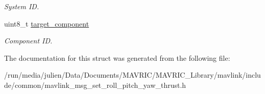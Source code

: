 \begin{DoxyCompactItemize}
\begin{DoxyCompactList}\small\item\em System I\+D. \end{DoxyCompactList}\item 
\hypertarget{struct____mavlink__set__roll__pitch__yaw__thrust__t_a59af37fe8843779a2aca045357ac9c96}{uint8\+\_\+t \hyperlink{struct____mavlink__set__roll__pitch__yaw__thrust__t_a59af37fe8843779a2aca045357ac9c96}{target\+\_\+component}}\label{struct____mavlink__set__roll__pitch__yaw__thrust__t_a59af37fe8843779a2aca045357ac9c96}

\begin{DoxyCompactList}\small\item\em Component I\+D. \end{DoxyCompactList}\end{DoxyCompactItemize}


The documentation for this struct was generated from the following file\+:\begin{DoxyCompactItemize}
\item 
/run/media/julien/\+Data/\+Documents/\+M\+A\+V\+R\+I\+C/\+M\+A\+V\+R\+I\+C\+\_\+\+Library/mavlink/include/common/mavlink\+\_\+msg\+\_\+set\+\_\+roll\+\_\+pitch\+\_\+yaw\+\_\+thrust.\+h\end{DoxyCompactItemize}
